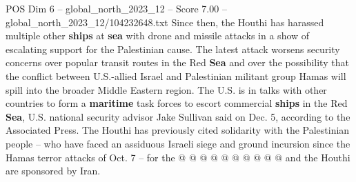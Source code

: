 \begin{textsample}{POS Dim 6 – global\_north\_2023\_12 – Score 7.00 – global\_north\_2023\_12/104232648.txt}
Since then, the Houthi has harassed multiple other \textbf{ships} at \textbf{sea} with drone and missile attacks in a show of escalating support for the Palestinian cause.
The latest attack worsens security concerns over popular transit routes in the Red \textbf{Sea} and over the possibility that the conflict between U.S.-allied Israel and Palestinian militant group Hamas will spill into the broader Middle Eastern region.
The U.S. is in talks with other countries to form a \textbf{maritime} task forces to escort commercial \textbf{ships} in the Red \textbf{Sea}, U.S. national security advisor Jake Sullivan said on Dec. 5, according to the Associated Press.
The Houthi has previously cited solidarity with the Palestinian people -- who have faced an assiduous Israeli siege and ground incursion since the Hamas terror attacks of Oct. 7 -- for the @ @ @ @ @ @ @ @ @ @ and the Houthi are sponsored by Iran.

\end{textsample}
